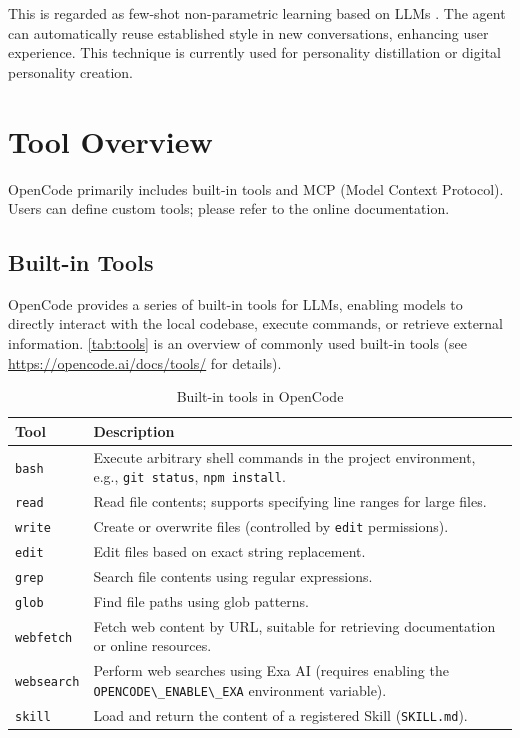 \documentclass[]{article}
\newcommand{\passthrough}[1]{#1}
\newcommand{\qe}[1]{\passthrough{\lstinline!#1!}}
\newcommand{\myline}{\begin{center}\rule{0.5\linewidth}{0.5pt}\end{center}}
\begin{document}
This is regarded as few-shot non-parametric learning based on LLMs
\cite{brown-2020,madotto2021few,dong-2024}. The agent can automatically reuse
established style in new conversations, enhancing user experience. This
technique is currently used for personality distillation or digital
personality creation.


\section{Tool Overview}\label{sec:tool-overview}

OpenCode primarily includes built-in tools and MCP (Model Context
Protocol). Users can define custom tools; please refer to the online
documentation.

\subsection{Built-in Tools}\label{sec:built-in-tools}

OpenCode provides a series of built-in tools for LLMs,
enabling models to directly interact with the local codebase, execute
commands, or retrieve external information. \autoref{tab:tools} is an overview of
commonly used built-in tools (see \url{https://opencode.ai/docs/tools/} for
details).

\begin{longtable}[]{@{}
  >{\raggedright\arraybackslash}p{}
  >{\raggedright\arraybackslash}p{}@{}}
\caption{Built-in tools in OpenCode}\label{tab:tools}\\
\toprule
\begin{minipage}[b]{\linewidth}\raggedright
Tool
\end{minipage} & \begin{minipage}[b]{\linewidth}\raggedright
Description
\end{minipage} \\
\midrule
\endhead
\bottomrule
\endlastfoot
\qe{bash} & Execute arbitrary shell commands in the
project environment, e.g., \qe{git status},
\qe{npm install}. \\
\qe{read} & Read file contents; supports specifying
line ranges for large files. \\
\qe{write} & Create or overwrite files (controlled
by \qe{edit} permissions). \\
\qe{edit} & Edit files based on exact string
replacement. \\
\qe{grep} & Search file contents using regular
expressions. \\
\qe{glob} & Find file paths using glob patterns. \\
\qe{webfetch} & Fetch web content by URL, suitable
for retrieving documentation or online resources. \\
\qe{websearch} & Perform web searches using Exa AI
(requires enabling the \qe{OPENCODE\_ENABLE\_EXA}
environment variable). \\
\qe{skill} & Load and return the content of a
registered Skill (\qe{SKILL.md}). \\
\end{longtable}
\end{document}
